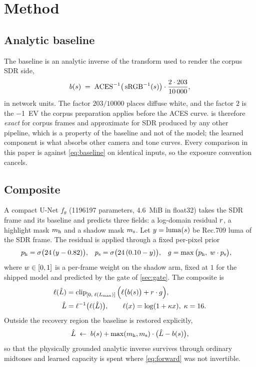 \section{Method}
\label{sec:method}

\subsection{Analytic baseline}
\label{sec:baseline}

The baseline is an analytic inverse of the transform used to render the corpus
SDR side,
\begin{equation}
b(s) \;=\; \operatorname{ACES}^{-1}\!\big(\operatorname{sRGB}^{-1}(s)\big)
\cdot \frac{2 \cdot 203}{\num{10000}},
\label{eq:baseline}
\end{equation}
in network units. The factor $203/\num{10000}$ places diffuse white, and the
factor $2$ is the \SI{-1}{EV} the corpus preparation applies before the ACES
curve.  is therefore \emph{exact} for corpus frames and
approximate for SDR produced by any other pipeline, which is a property of the
baseline and not of the model; the learned component is what absorbs other
camera and tone curves. Every comparison in this paper is against
\cref{eq:baseline} on identical inputs, so the exposure convention cancels.

\subsection{Composite}
\label{sec:composite}

A compact U-Net $f_\theta$ (\num{1196197} parameters, \SI{4.6}{MiB} in float32)
takes the SDR frame and its baseline and predicts three fields: a log-domain
residual $r$, a highlight mask $m_{\mathrm{h}}$ and a shadow mask $m_{\mathrm{s}}$. Let
$y = \operatorname{luma}(s)$ be Rec.709 luma of the SDR frame. The residual is
applied through a fixed per-pixel prior
\begin{align}
p_{\mathrm{h}} &= \sigma\big(24\,(y - 0.82)\big), &
p_{\mathrm{s}} &= \sigma\big(24\,(0.10 - y)\big), &
g &= \max\big(p_{\mathrm{h}},\; w \cdot p_{\mathrm{s}}\big),
\label{eq:prior}
\end{align}
where $w \in [0,1]$ is a per-frame weight on the shadow arm, fixed at $1$ for
the shipped model and predicted by the gate of \cref{sec:gate}. The composite is
\begin{align}
\ell(\hat{L}) &= \operatorname{clip}_{[0,\;\ell(L_{\max})]}\Big(\ell\big(b(s)\big) + r \cdot g\Big),
\label{eq:composite}\\
\hat{L} &= \ell^{-1}\big(\ell(\hat{L})\big),
\qquad \ell(x) = \log(1 + \kappa x),\; \kappa = 16 .
\end{align}
Outside the recovery region the baseline is restored explicitly,
\begin{equation}
\hat{L} \;\leftarrow\; b(s) + \max(m_{\mathrm{h}}, m_{\mathrm{s}})\cdot\big(\hat{L} - b(s)\big),
\label{eq:preserve}
\end{equation}
so that the physically grounded analytic inverse survives through ordinary
midtones and learned capacity is spent where \cref{eq:forward} was not
invertible.


